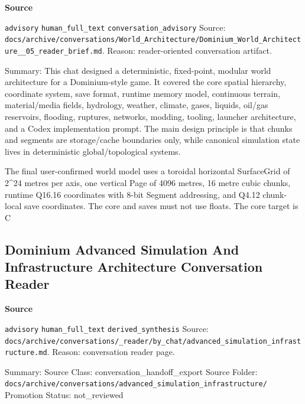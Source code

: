 \documentclass[9pt,a4paper,openany]{book}
\newcommand{\vonecallout}[3]{\par\medskip\noindent\begingroup\setlength{\fboxsep}{7pt}\colorbox{DomCalloutBg}{\parbox{0.94\linewidth}{\textbf{\textcolor{#1}{#2}}\par #3}}\endgroup\par\medskip}
\begin{document}
\vonecallout{DomSlate}{Source}{\texttt{advisory} \texttt{human\_\allowbreak{}full\_\allowbreak{}text} \texttt{conversation\_\allowbreak{}advisory} Source: \texttt{docs/\allowbreak{}archive/\allowbreak{}conversations/\allowbreak{}World\_\allowbreak{}Architecture/\allowbreak{}Dominium\_\allowbreak{}World\_\allowbreak{}Architecture\_\allowbreak{}\_\allowbreak{}05\_\allowbreak{}reader\_\allowbreak{}brief.\allowbreak{}md}.\allowbreak{} Reason: reader-\allowbreak{}oriented conversation artifact.\allowbreak{}}

Summary: This chat designed a deterministic, fixed-\allowbreak{}point, modular world architecture for a Dominium-\allowbreak{}style game.\allowbreak{} It covered the core spatial hierarchy, coordinate system, save format, runtime memory model, continuous terrain, material/\allowbreak{}media fields, hydrology, weather, climate, gases, liquids, oil/\allowbreak{}gas reservoirs, flooding, ruptures, networks, modding, tooling, launcher architecture, and a Codex implementation prompt.\allowbreak{} The main design principle is that chunks and segments are storage/\allowbreak{}cache boundaries only, while canonical simulation state lives in deterministic global/\allowbreak{}topological systems.\allowbreak{}


The final user-\allowbreak{}confirmed world model uses a toroidal horizontal SurfaceGrid of 2\textasciicircum{}24 metres per axis, one vertical Page of 4096 metres, 16 metre cubic chunks, runtime Q16.\allowbreak{}16 coordinates with 8-\allowbreak{}bit Segment addressing, and Q4.\allowbreak{}12 chunk-\allowbreak{}local save coordinates.\allowbreak{} The core and saves must not use floats.\allowbreak{} The core target is C



\subsection{Dominium Advanced Simulation And Infrastructure Architecture Conversation Reader}

\vonecallout{DomSlate}{Source}{\texttt{advisory} \texttt{human\_\allowbreak{}full\_\allowbreak{}text} \texttt{derived\_\allowbreak{}synthesis} Source: \texttt{docs/\allowbreak{}archive/\allowbreak{}conversations/\allowbreak{}\_\allowbreak{}reader/\allowbreak{}by\_\allowbreak{}chat/\allowbreak{}advanced\_\allowbreak{}simulation\_\allowbreak{}infrastructure.\allowbreak{}md}.\allowbreak{} Reason: conversation reader page.\allowbreak{}}

Summary: Source Class: conversation\_\allowbreak{}handoff\_\allowbreak{}export Source Folder: \texttt{docs/\allowbreak{}archive/\allowbreak{}conversations/\allowbreak{}advanced\_\allowbreak{}simulation\_\allowbreak{}infrastructure/\allowbreak{}} Promotion Status: not\_\allowbreak{}reviewed
\end{document}
